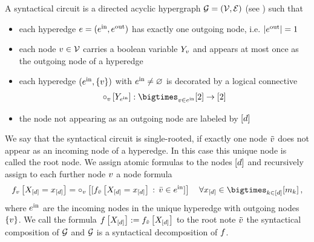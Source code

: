 \begin{definition}
    \label{def:formulaDecomposition}
    A syntactical circuit is a directed acyclic hypergraph $\mathcal{G}=(\mathcal{V},\mathcal{E})$ (see ) such that
    \begin{itemize}
        \item each hyperedge $e=(e^{\mathrm{in}},e^{\mathrm{out}})$ has exactly one outgoing node, i.e. $\left|e^{\mathrm{out}}\right|=1$
        \item each node $v\in\mathcal{V}$ carries a boolean variable $Y_{v}$ and appears at most once as the outgoing node of a hyperedge %
        \item each hyperedge $(e^{\mathrm{in}},\{v\})$ with $e^{\mathrm{in}}\neq\varnothing$ is decorated by a logical connective
        \begin{align*}
            \connectiveofat{\node}{\headvariableof{\incomingnodes}} : \bigtimes_{\node\in\incomingnodes} [2] \rightarrow [2]
        \end{align*}
        \item the node not appearing as an outgoing node are labeled by $[d]$
    \end{itemize}
    We say that the syntactical circuit is single-rooted, if exactly one node $\tilde{v}$ does not appear as an incoming node of a hyperedge.
    In this case this unique node is called the root node. %
    We assign atomic formulas to the nodes $[d]$ and recursively assign to each further node $v$ a node formula %
    \begin{align*}
        \formulaofat{\node}{\indexedshortcatvariables}
        = \connectiveofat{\node}{[\formulaofat{\thirdnode}{\indexedshortcatvariables}\wcols\thirdnode\in\incomingnodes]} \quad \forall\shortcatindicesin\, ,
    \end{align*}
    where $e^{\mathrm{in}}$ are the incoming nodes in the unique hyperedge with outgoing nodes $\{v\}$.
    We call the formula $f\left[X_{[d]}\right]:=f_{\tilde{v}}\left[X_{[d]}\right]$ to the root note $\tilde{v}$ the syntactical composition of $\mathcal{G}$ and $\mathcal{G}$ is a syntactical decomposition of $f$.
\end{definition}

